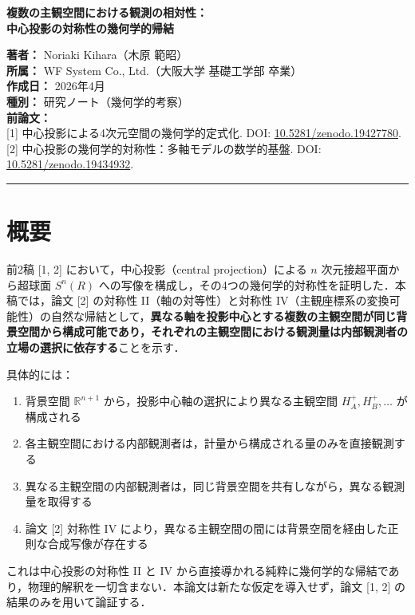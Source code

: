 \documentclass[a4paper,11pt]{ltjsarticle}
\theoremstyle{definition}
\begin{document}
\begin{center}
{\LARGE\bfseries 複数の主観空間における観測の相対性：\\中心投影の対称性の幾何学的帰結}
\end{center}

\bigskip

\noindent\textbf{著者：} Noriaki Kihara（木原 範昭）\\
\textbf{所属：} WF System Co., Ltd.（大阪大学 基礎工学部 卒業）\\
\textbf{作成日：} 2026年4月\\
\textbf{種別：} 研究ノート（幾何学的考察）\\
\textbf{前論文：}\\
{[1]} 中心投影による4次元空間の幾何学的定式化. DOI: \href{https://doi.org/10.5281/zenodo.19427780}{10.5281/zenodo.19427780}.\\
{[2]} 中心投影の幾何学的対称性：多軸モデルの数学的基盤. DOI: \href{https://doi.org/10.5281/zenodo.19434932}{10.5281/zenodo.19434932}.

\bigskip\hrule\bigskip

\section*{概要}

前2稿 {[1, 2]} において，中心投影（central projection）による \(n\) 次元接超平面から超球面 \(S^n(R)\) への写像を構成し，その4つの幾何学的対称性を証明した．本稿では，論文 {[2]} の対称性 II（軸の対等性）と対称性 IV（主観座標系の変換可能性）の自然な帰結として，\textbf{異なる軸を投影中心とする複数の主観空間が同じ背景空間から構成可能であり，それぞれの主観空間における観測量は内部観測者の立場の選択に依存する}ことを示す．

具体的には：

\begin{enumerate}
\item 背景空間 \(\mathbb{R}^{n+1}\) から，投影中心軸の選択により異なる主観空間 \(H_A^+, H_B^+, \ldots\) が構成される
\item 各主観空間における内部観測者は，計量から構成される量のみを直接観測する
\item 異なる主観空間の内部観測者は，同じ背景空間を共有しながら，異なる観測量を取得する
\item 論文 {[2]} 対称性 IV により，異なる主観空間の間には背景空間を経由した正則な合成写像が存在する
\end{enumerate}

これは中心投影の対称性 II と IV から直接導かれる純粋に幾何学的な帰結であり，物理的解釈を一切含まない．本論文は新たな仮定を導入せず，論文 {[1, 2]} の結果のみを用いて論証する．
\end{document}

